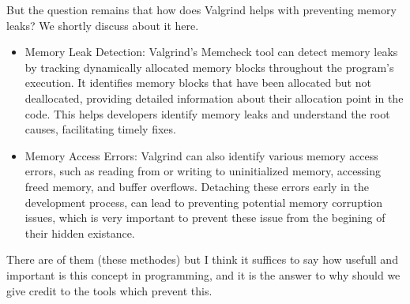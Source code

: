 \documentclass{article}
\begin{document}
	But the question remains that how does Valgrind helps with preventing memory leaks? We shortly discuss about it here.

	\begin{itemize}

		\item Memory Leak Detection:
		Valgrind's Memcheck tool can detect memory leaks by tracking dynamically allocated memory blocks throughout the program's execution.
		It identifies memory blocks that have been allocated but not deallocated, providing detailed information about their allocation point in the code.
		This helps developers identify memory leaks and understand the root causes, facilitating timely fixes.

		\item Memory Access Errors:
		Valgrind can also identify various memory access errors, such as reading from or writing to uninitialized memory, accessing freed memory, and buffer overflows. Detaching these errors early in the development process, can lead to preventing potential memory corruption issues, which is very important to prevent these issue from the begining of their hidden existance.

	\end{itemize}

	There are of them (these methodes) but I think it suffices to say how usefull and important is this concept in programming, and it is the answer to why should we give credit to the tools which prevent this.


	
\end{document}
